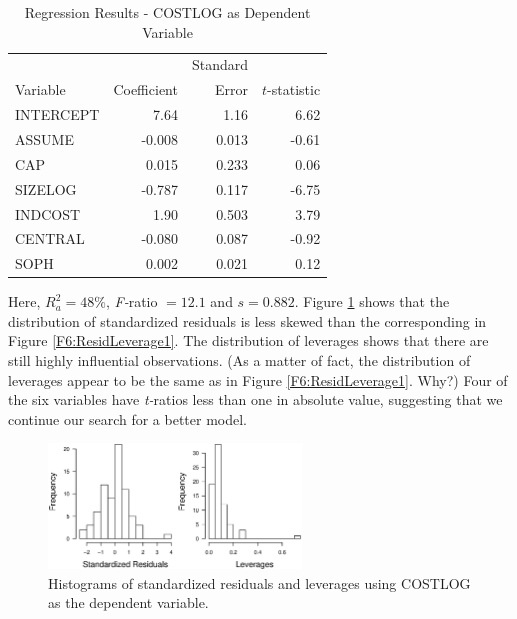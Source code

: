 \begin{table}[h]
 \caption{\label{T6:FirmRiskNew} Regression Results -
COSTLOG as Dependent Variable}
\begin{tabular}{l|rrr}
\hline
 &  & Standard &  \\
Variable & Coefficient & Error & $t$-statistic \\
\hline
INTERCEPT & 7.64 & 1.16 & 6.62 \\
ASSUME & -0.008 & 0.013 & -0.61 \\
CAP & 0.015 & 0.233 & 0.06 \\
SIZELOG & -0.787 & 0.117 & -6.75 \\
INDCOST & 1.90 & 0.503 & 3.79 \\
CENTRAL & -0.080 & 0.087 & -0.92 \\
SOPH & 0.002 & 0.021 & 0.12 \\
\hline
\end{tabular}
  \end{table}

\noindent Here, $R_{a}^{2}=48\%$, \textit{F-}ratio $=12.1$ and
$s=0.882$. Figure \ref{F6:ResidLeverage2} shows that the
distribution of standardized residuals is less skewed than the
corresponding in Figure \ref{F6:ResidLeverage1}. The distribution of
leverages shows that there are still highly influential
observations. (As a matter of fact, the distribution of leverages
appear to be the same as in Figure \ref{F6:ResidLeverage1}. Why?)
Four of the six variables have \textit{t-}ratios less than one in
absolute value, suggesting that we continue our search for a better
model.

\begin{figure}[htp]
  \begin{center}
   \includegraphics[width=0.6\textwidth]{Chapter6/F6ResidLeverage2.eps}
    \caption{\label{F6:ResidLeverage2} \small {Histograms of
    standardized residuals and leverages using COSTLOG as the
    dependent variable.}}
  \end{center}
\end{figure}

